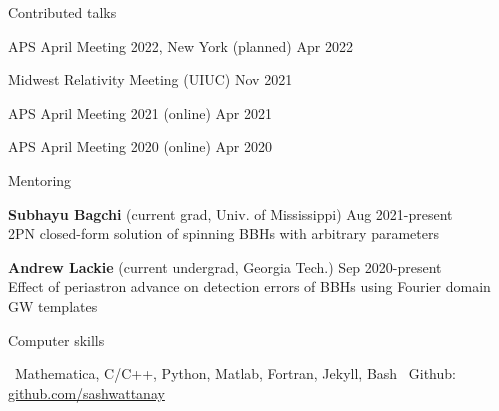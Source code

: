 \documentclass{resume} %
\begin{document}
\begin{rSection}{Contributed talks}



APS April Meeting 2022, New York (planned)  \hfill Apr 2022

Midwest Relativity Meeting (UIUC)      \hfill Nov 2021

APS April Meeting 2021 (online) \hfill Apr 2021

APS April Meeting 2020 (online) \hfill Apr 2020





\end{rSection}

\fi



\begin{rSection}{Mentoring}




 {\bf Subhayu Bagchi}  {\footnotesize  (current grad, Univ. of Mississippi)}                                                                         \hfill Aug 2021-present  \\
{\footnotesize 2PN closed-form solution of spinning BBHs with arbitrary parameters}    

{\bf Andrew Lackie}    {\footnotesize  (current undergrad, Georgia Tech.)}                                                                      \hfill Sep 2020-present  \\
{\footnotesize Effect of periastron advance on detection errors of BBHs using Fourier domain GW templates}



 
\end{rSection}



   

\begin{rSection}{Computer skills}



\textbullet~Mathematica, C/C++, Python, Matlab, Fortran, Jekyll, Bash 
\textbullet~Github: \href{https://github.com/sashwattanay}{github.com/sashwattanay}



\end{rSection}
\end{document}
